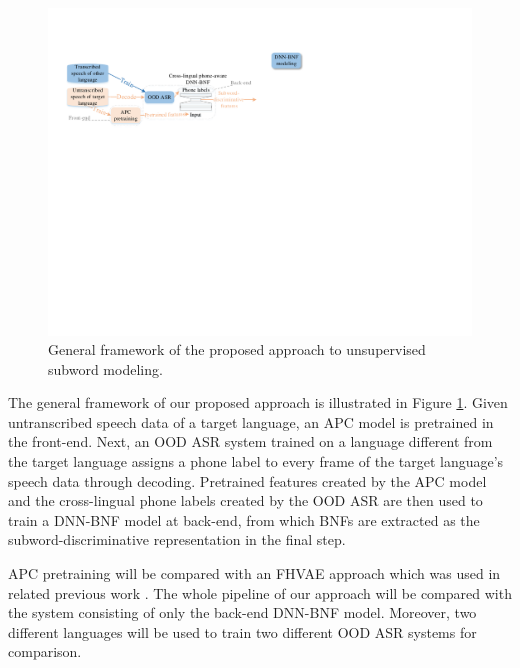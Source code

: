 \documentclass[a4paper]{article}
\begin{document}
\begin{figure}
    \centering
    \includegraphics[width=\linewidth]{LaTeX/apc_framework_detail_other_lang.pdf}
    \caption{General framework of the proposed approach to unsupervised subword modeling.  }
    \label{fig:general_framework}
\end{figure}
The general framework of our proposed approach is illustrated in Figure \ref{fig:general_framework}. Given untranscribed speech data of a  target  language, an APC  model is pretrained in the front-end.
Next, an OOD ASR system trained on a language different from the target language  assigns a phone label to every frame of the target language's speech data through decoding. Pretrained features  created by the APC model and the cross-lingual phone labels created by the OOD ASR are then used to train a DNN-BNF model at back-end, from which BNFs are extracted as the subword-discriminative representation in the final step.

{\color{blue}APC pretraining will be compared with an FHVAE approach \cite{hsu2017nips} which was used in related previous work \cite{Feng2019improving}. The whole pipeline of our approach will be compared with the system consisting of only the back-end DNN-BNF model.
Moreover, two different languages will be used to train two different OOD ASR systems for comparison.}
\end{document}
